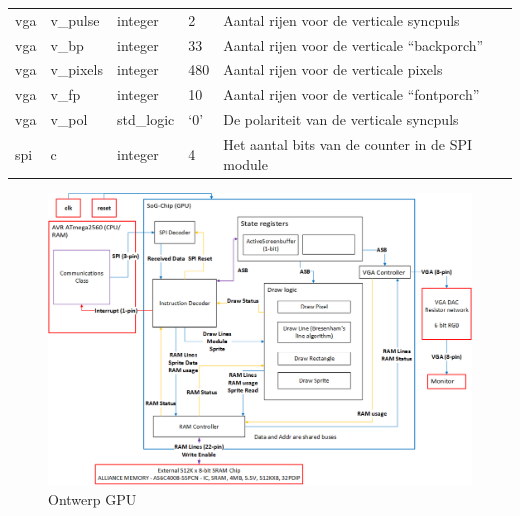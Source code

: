 \documentclass{scrartcl} %
\begin{document}
\begin{table}[H]
\begin{tabular}{l l l l l}
	vga & v\_pulse & integer & 2 & Aantal rijen voor de verticale syncpuls\\ 
	vga & v\_bp & integer & 33 & Aantal rijen voor de verticale “backporch” \\ 
	vga & v\_pixels & integer & 480 & Aantal rijen voor de verticale pixels\\ 
	vga & v\_fp & integer & 10 & Aantal rijen voor de verticale “fontporch” \\ 
	vga & v\_pol & std\_logic & ‘0’ & De polariteit van de verticale syncpuls\\ 
	spi & c & integer & 4 & Het aantal bits van de counter in de SPI module\\
  	\hline
\end{tabular}
\end{table}

\begin{figure}[H]
\centering
	\includegraphics[scale=0.9, angle=90]{resource/systeemdrawing-detail.png}
	\caption{Ontwerp GPU}
	\label{fig:Blokschema GPU}
\end{figure}


\end{document}
